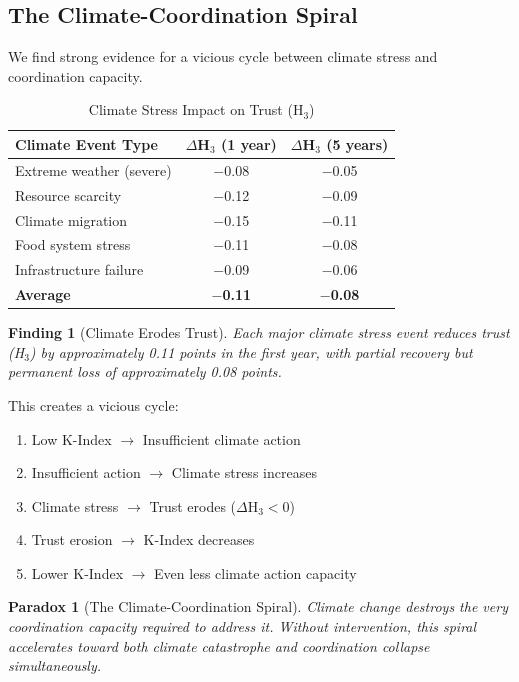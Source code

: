 \documentclass[12pt,a4paper]{article}
\newtheorem{finding}{Finding}
\newtheorem{paradox}{Paradox}
\begin{document}
\subsection{The Climate-Coordination Spiral}

We find strong evidence for a vicious cycle between climate stress and coordination capacity.

\begin{table}[H]
\centering
\caption{Climate Stress Impact on Trust (H$_3$)}
\label{tab:spiral}
\begin{tabular}{lcc}
\toprule
\textbf{Climate Event Type} & \textbf{$\Delta$H$_3$ (1 year)} & \textbf{$\Delta$H$_3$ (5 years)} \\
\midrule
Extreme weather (severe) & $-$0.08 & $-$0.05 \\
Resource scarcity & $-$0.12 & $-$0.09 \\
Climate migration & $-$0.15 & $-$0.11 \\
Food system stress & $-$0.11 & $-$0.08 \\
Infrastructure failure & $-$0.09 & $-$0.06 \\
\midrule
\textbf{Average} & \textbf{$-$0.11} & \textbf{$-$0.08} \\
\bottomrule
\end{tabular}
\end{table}

\begin{finding}[Climate Erodes Trust]
Each major climate stress event reduces trust (H$_3$) by approximately 0.11 points in the first year, with partial recovery but permanent loss of approximately 0.08 points.
\end{finding}

This creates a vicious cycle:

\begin{enumerate}
    \item Low K-Index $\rightarrow$ Insufficient climate action
    \item Insufficient action $\rightarrow$ Climate stress increases
    \item Climate stress $\rightarrow$ Trust erodes ($\Delta$H$_3 < 0$)
    \item Trust erosion $\rightarrow$ K-Index decreases
    \item Lower K-Index $\rightarrow$ Even less climate action capacity
\end{enumerate}

\begin{paradox}[The Climate-Coordination Spiral]
Climate change destroys the very coordination capacity required to address it. Without intervention, this spiral accelerates toward both climate catastrophe and coordination collapse simultaneously.
\end{paradox}
\end{document}
